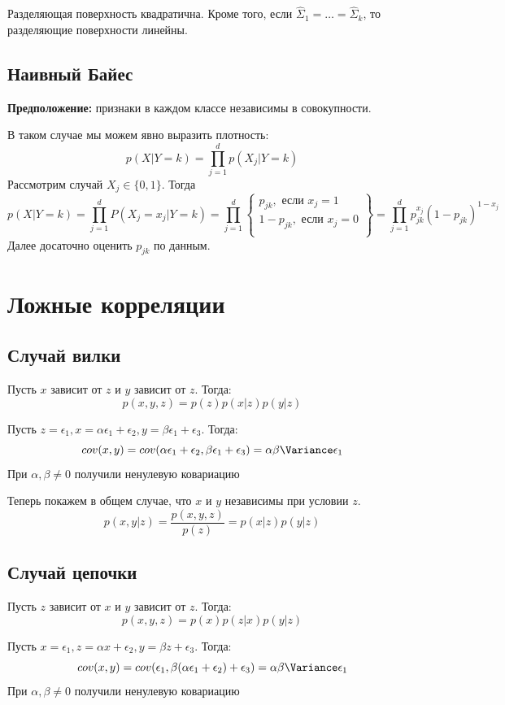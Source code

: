 \begin{note}
    Разделяющая поверхность квадратична. Кроме того, если \(\widehat{\Sigma}_1 = \dots = \widehat{\Sigma}_k\), то разделяющие поверхности линейны.
\end{note}

\subsection{Наивный Байес}

\textbf{Предположение:} признаки в каждом классе независимы в совокупности. 

В таком случае мы можем явно выразить плотность:
\[p(X|Y = k) = \prod_{j = 1}^d p(X_j|Y = k)\]
Рассмотрим случай \(X_j \in \{0, 1\}\). Тогда 
\[p(X|Y = k) = \prod_{j = 1}^dP(X_j = x_j|Y = k) = \prod_{j = 1}^d\left\{\begin{array}{c}
    p_{jk},\text{ если }x_j = 1 \\
    1 - p_{jk},\text{ если }x_j = 0 \\
\end{array}\right\} = \prod_{j = 1}^d p_{jk}^{x_j}(1 - p_{jk})^{1 - x_j}\]
Далее досаточно оценить \(p_{jk}\) по данным.

\section{Ложные корреляции}
\subsection{Случай вилки}
Пусть \(x\) зависит от \(z\) и \(y\) зависит от \(z\). Тогда:
\[p(x, y, z) = p(z)p(x|z)p(y|z)\]
\begin{example}
    Пусть \(z = \epsilon_1, x = \alpha \epsilon_1 + \epsilon_2, y = \beta \epsilon_1 + \epsilon_3\). Тогда:
    \[cov(x, y) = cov( \alpha \epsilon_1 + \epsilon_2, \beta \epsilon_1 + \epsilon_3) = \alpha\beta \Variance\epsilon_1\]
    При \(\alpha, \beta \ne 0\) получили ненулевую ковариацию
\end{example}

Теперь покажем в общем случае, что \(x\) и \(y\) независимы при условии \(z\).
\[p(x, y|z) = \frac{p(x, y, z)}{p(z)} = p(x|z)p(y|z)\]

\subsection{Случай цепочки}
Пусть \(z\) зависит от \(x\) и \(y\) зависит от \(z\). Тогда:
\[p(x, y, z) = p(x)p(z|x)p(y|z)\]
\begin{example}
    Пусть \(x = \epsilon_1, z = \alpha x + \epsilon_2, y = \beta z + \epsilon_3\). Тогда:
    \[cov(x, y) = cov(\epsilon_1, \beta(\alpha \epsilon_1 + \epsilon_2) + \epsilon_3) = \alpha\beta \Variance\epsilon_1\]
    При \(\alpha, \beta \ne 0\) получили ненулевую ковариацию
\end{example}

